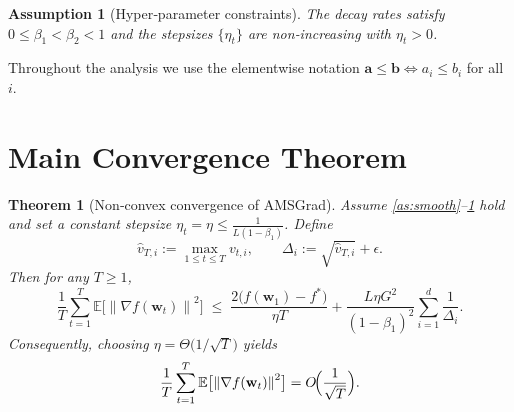\documentclass[11pt]{article}
\newtheorem{theorem}{Theorem}
\newtheorem{assumption}{Assumption}
\newcommand{\EE}{\mathbb{E}}
\newcommand{\norm}[1]{\left\lVert #1\right\rVert}
\begin{document}
\begin{assumption}[Hyper‑parameter constraints]\label{as:params}
The decay rates satisfy $0\le\beta_{1}<\beta_{2}<1$ and the stepsizes
$\{\eta_{t}\}$ are non‑increasing with $\eta_{t}>0$.
\end{assumption}

Throughout the analysis we use the elementwise notation
$\mathbf{a}\le\mathbf{b}\iff a_{i}\le b_{i}$ for all $i$.

\section{Main Convergence Theorem}
\label{sec:theorem}
\begin{theorem}[Non‑convex convergence of AMSGrad]\label{thm:amsgrad}
Assume \ref{as:smooth}–\ref{as:params} hold and set a constant stepsize
$\eta_{t}=\eta\le\frac{1}{L(1-\beta_{1})}$.
Define
\[
\hat{v}_{T,i}:=\max_{1\le t\le T}v_{t,i},\qquad
\Delta_{i}:= \sqrt{\hat{v}_{T,i}}+\epsilon .
\]
Then for any $T\ge1$,
\[
\frac{1}{T}\sum_{t=1}^{T}\EE\bigl[\norm{\nabla f(\mathbf{w}_{t})}^{2}\bigr]
\;\le\;
\frac{2\bigl(f(\mathbf{w}_{1})-f^{*}\bigr)}{\eta T}
+\frac{L\eta G^{2}}{(1-\beta_{1})^{2}}
\sum_{i=1}^{d}\frac{1}{\Delta_{i}} .
\tag{2}
\]
Consequently, choosing $\eta = \Theta\!\bigl(1/\sqrt{T}\bigr)$ yields
\[
\frac{1}{T}\sum_{t=1}^{T}\EE\bigl[\norm{\nabla f(\mathbf{w}_{t})}^{2}\bigr]
= O\!\Bigl(\frac{1}{\sqrt{T}}\Bigr).
\]
\end{theorem}

\end{document}
